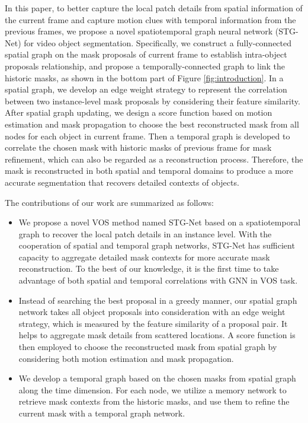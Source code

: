 \documentclass[letterpaper]{article} %
\begin{document}
In this paper, to better capture the local patch details from spatial information of the current frame and capture motion clues with temporal information from the previous frames, we propose a novel spatiotemporal graph neural network (STG-Net) for video object segmentation. Specifically, we construct a fully-connected spatial graph on the mask proposals of current frame to establish intra-object proposals relationship, and propose a temporally-connected graph to link the historic masks, as shown in the bottom part of Figure \ref{fig:introduction}. In a spatial graph, we develop an edge weight strategy to represent the correlation between two instance-level mask proposals by considering their feature similarity. After spatial graph updating, we design a score function based on motion estimation and mask propagation to choose the best reconstructed mask from all nodes for each object in current frame. Then a temporal graph is developed to correlate the chosen mask with historic masks of previous frame for mask refinement, which can also be regarded as a reconstruction process. Therefore, the mask is reconstructed in both spatial and temporal domains to produce a more accurate segmentation that recovers detailed contexts of objects.

The contributions of our work are summarized as follows:
\begin{itemize}
    \item We propose a novel VOS method named STG-Net based on a spatiotemporal graph to recover the local patch details in an instance level. With the cooperation of spatial and temporal graph networks, STG-Net has sufficient capacity to aggregate detailed mask contexts for more accurate mask reconstruction. To the best of our knowledge, it is the first time to take advantage of both spatial and temporal correlations with GNN in VOS task.
    \item
    Instead of searching the best proposal in a greedy manner, our spatial graph network takes all object proposals into consideration with an edge weight strategy, which is measured by the feature similarity of a proposal pair. It helps to aggregate mask details from scattered locations. A score function is then employed to choose the reconstructed mask from spatial graph by considering both motion estimation and mask propagation.
    \item We develop a temporal graph based on the chosen masks from spatial graph along the time dimension. For each node, we utilize a memory network to retrieve mask contexts from the historic masks, and use them to refine the current mask with a temporal graph network.
\end{itemize}
\end{document}
